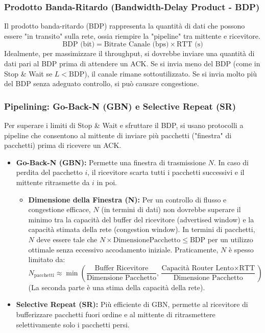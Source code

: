 \subsubsection{Prodotto Banda-Ritardo (Bandwidth-Delay Product - BDP)}
Il prodotto banda-ritardo (BDP) rappresenta la quantità di dati che possono essere "in transito" sulla rete, ossia riempire la "pipeline" tra mittente e ricevitore.
\[ \text{BDP (bit)} = \text{Bitrate Canale (bps)} \times \text{RTT (s)} \]
Idealmente, per massimizzare il throughput, si dovrebbe inviare una quantità di dati pari al BDP prima di attendere un ACK. Se si invia meno del BDP (come in Stop \& Wait se $L < \text{BDP}$), il canale rimane sottoutilizzato. Se si invia molto più del BDP senza adeguato controllo, si può causare congestione.

\subsubsection{Pipelining: Go-Back-N (GBN) e Selective Repeat (SR)}
Per superare i limiti di Stop \& Wait e sfruttare il BDP, si usano protocolli a pipeline che consentono al mittente di inviare più pacchetti ("finestra" di pacchetti) prima di ricevere un ACK.
\begin{itemize}
    \item \textbf{Go-Back-N (GBN):} Permette una finestra di trasmissione $N$. In caso di perdita del pacchetto $i$, il ricevitore scarta tutti i pacchetti successivi e il mittente ritrasmette da $i$ in poi.
        \begin{itemize}
            \item \textbf{Dimensione della Finestra (N):} Per un controllo di flusso e congestione efficace, $N$ (in termini di dati) non dovrebbe superare il minimo tra la capacità del buffer del ricevitore (advertised window) e la capacità stimata della rete (congestion window). In termini di pacchetti, $N$ deve essere tale che $N \times \text{DimensionePacchetto} \le \text{BDP}$ per un utilizzo ottimale senza eccessivo accodamento iniziale.
            Praticamente, $N$ è spesso limitato da:
            \[ N_{\text{pacchetti}} \approx \min\left(\frac{\text{Buffer Ricevitore}}{\text{Dimensione Pacchetto}}, \frac{\text{Capacità Router Lento} \times \text{RTT}}{\text{Dimensione Pacchetto}}\right) \]
            (La seconda parte è una stima della capacità della rete).
        \end{itemize}
    \item \textbf{Selective Repeat (SR):} Più efficiente di GBN, permette al ricevitore di bufferizzare pacchetti fuori ordine e al mittente di ritrasmettere selettivamente solo i pacchetti persi.
\end{itemize}

